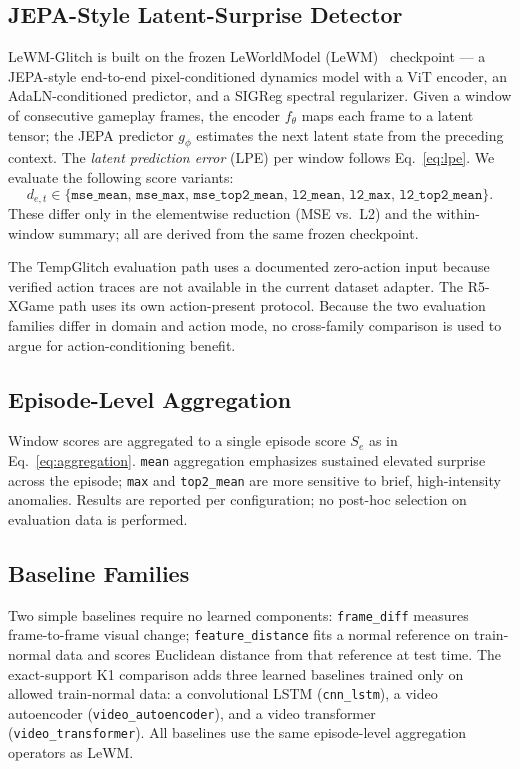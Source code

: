 \subsection{JEPA-Style Latent-Surprise Detector}

LeWM-Glitch is built on the frozen LeWorldModel (LeWM)~\cite{lewm} checkpoint --- a
JEPA-style end-to-end pixel-conditioned dynamics model with a ViT encoder, an AdaLN-conditioned
predictor, and a SIGReg spectral regularizer. Given a window of consecutive gameplay frames, the
encoder $f_\theta$ maps each frame to a latent tensor; the JEPA predictor $g_\phi$ estimates
the next latent state from the preceding context. The \emph{latent prediction error} (LPE) per
window follows Eq.~\ref{eq:lpe}. We evaluate the following score variants:
\begin{equation}
d_{e,t} \in \{\texttt{mse\_mean},\,\texttt{mse\_max},\,\texttt{mse\_top2\_mean},
  \,\texttt{l2\_mean},\,\texttt{l2\_max},\,\texttt{l2\_top2\_mean}\}.
\end{equation}
These differ only in the elementwise reduction (MSE vs.~L2) and the within-window
summary; all are derived from the same frozen checkpoint.

The TempGlitch evaluation path uses a documented zero-action input because verified action
traces are not available in the current dataset adapter. The R5-XGame path uses its own
action-present protocol. Because the two evaluation families differ in domain and action mode,
no cross-family comparison is used to argue for action-conditioning benefit.

\subsection{Episode-Level Aggregation}

Window scores are aggregated to a single episode score $S_e$ as in Eq.~\ref{eq:aggregation}.
\texttt{mean} aggregation emphasizes sustained elevated surprise across the episode;
\texttt{max} and \texttt{top2\_mean} are more sensitive to brief, high-intensity anomalies.
Results are reported per configuration; no post-hoc selection on evaluation data is performed.

\subsection{Baseline Families}

Two simple baselines require no learned components: \texttt{frame\_diff} measures
frame-to-frame visual change; \texttt{feature\_distance} fits a normal reference on
train-normal data and scores Euclidean distance from that reference at test time.
The exact-support K1 comparison adds three learned baselines trained only on allowed
train-normal data: a convolutional LSTM (\texttt{cnn\_lstm}), a video autoencoder
(\texttt{video\_autoencoder}), and a video transformer (\texttt{video\_transformer}).
All baselines use the same episode-level aggregation operators as LeWM.

